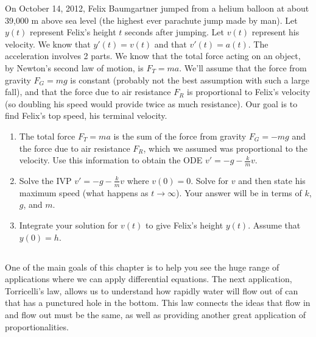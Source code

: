 \begin{problem}
On October 14, 2012, Felix Baumgartner jumped from a helium balloon at about 39,000 m above sea level (the highest ever parachute jump made by man). 
Let $y(t)$ represent Felix's height $t$ seconds after jumping.  Let $v(t)$ represent his velocity.  
We know that $y'(t) = v(t)$ and that $v'(t)=a(t)$. 
The acceleration involves 2 parts.  We know that the total force acting on an object, by Newton's second law of motion, is $F_T=ma$.
We'll assume that the force from gravity $F_G=mg$ is constant (probably not the best assumption with such a large fall), and that the force due to air resistance $F_R$ is proportional to Felix's velocity (so doubling his speed would provide twice as much resistance).  Our goal is to find Felix's top speed, his terminal velocity. 
\begin{enumerate}
 \item The total force $F_T=ma$ is the sum of the force from gravity $F_G = -mg$ and the force due to air resistance $F_R$, which we assumed was proportional to the velocity.  Use this information to obtain the ODE $v'=-g-\frac{k}{m}v$.  
 \item 
Solve the IVP $v'=-g-\frac{k}{m}v$ where $v(0)=0$. 
%
Solve for $v$ and then state his maximum speed (what happens as $t\to \infty$). Your answer will be in terms of $k$, $g$, and $m$. 
 \item Integrate your solution for $v(t)$ to give Felix's height $y(t)$. Assume that $y(0)=h$. 
\end{enumerate}
\end{problem}




\subsection*{\ideaA}
One of the main goals of this chapter is to help you see the huge range of applications where we can apply differential equations. The next application, Torricelli's law, allows us to understand how rapidly water will flow out of can that has a punctured hole in the bottom. This law connects the ideas that flow in and flow out must be the same, as well as providing another great application of proportionalities.

